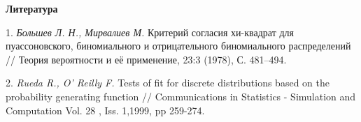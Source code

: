 \smallskip \centerline{\bf Литература}\nopagebreak

1. {\it Большев Л. Н., Мирвалиев М.} Критерий согласия хи-квадрат для пуассоновского, биномиального и отрицательного биномиального распределений // Теория вероятности и её применение, 23:3 (1978), С. 481--494.


2. {\it Rueda R., O' Reilly F.} Tests of fit for discrete distributions based on the probability generating function // Communications in Statistics - Simulation and Computation Vol. 28 , Iss. 1,1999, pp 259-274.
